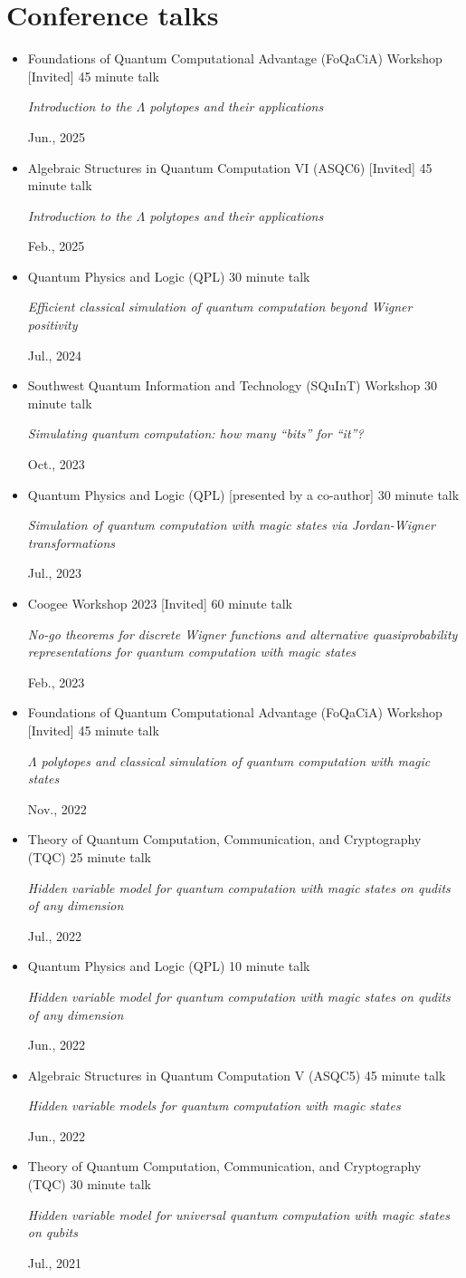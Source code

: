 \documentclass[letterpaper,11pt]{article}
\newcommand{\ConferenceItem}[4]{
	\item{\parbox{0.97\textwidth}{
		{#1} \hfill {#2}\\
		\parbox{0.86\textwidth}{\emph{#3}} \hfill {#4}
	}}
}
\begin{document}
\section*{Conference talks}
\begin{itemize}[leftmargin=*]
	\ConferenceItem{Foundations of Quantum Computational Advantage (FoQaCiA) Workshop [Invited]}{45 minute talk}{Introduction to the $\Lambda$ polytopes and their applications}{Jun., 2025}
	
	\ConferenceItem{Algebraic Structures in Quantum Computation VI (ASQC6) [Invited]}{45 minute talk}{Introduction to the $\Lambda$ polytopes and their applications}{Feb., 2025}
	
	\ConferenceItem{Quantum Physics and Logic (QPL)}{30 minute talk}{Efficient classical simulation of quantum computation beyond Wigner positivity}{Jul., 2024}
	
	\ConferenceItem{Southwest Quantum Information and Technology (SQuInT) Workshop}{30 minute talk}{Simulating quantum computation: how many ``bits'' for ``it''?}{Oct., 2023}
	
	\ConferenceItem{Quantum Physics and Logic (QPL) [presented by a co-author]}{30 minute talk}{Simulation of quantum computation with magic states via Jordan-Wigner transformations}{Jul., 2023}
	
	\ConferenceItem{Coogee Workshop 2023 [Invited]}{60 minute talk}{No-go theorems for discrete Wigner functions and alternative quasiprobability representations for quantum computation with magic states}{Feb., 2023}
	
	\ConferenceItem{Foundations of Quantum Computational Advantage (FoQaCiA) Workshop [Invited]}{45 minute talk}{$\Lambda$ polytopes and classical simulation of quantum computation with magic states}{Nov., 2022}
	
	\ConferenceItem{Theory of Quantum Computation, Communication, and Cryptography (TQC)}{25 minute talk}{Hidden variable model for quantum computation with magic states on qudits of any dimension}{Jul., 2022}
	
	\ConferenceItem{Quantum Physics and Logic (QPL)}{10 minute talk}{Hidden variable model for quantum computation with magic states on qudits of any dimension}{Jun., 2022}
	
	\ConferenceItem{Algebraic Structures in Quantum Computation V (ASQC5)}{45 minute talk}{Hidden variable models for quantum computation with magic states}{Jun., 2022}
	
	\ConferenceItem{Theory of Quantum Computation, Communication, and Cryptography (TQC)}{30 minute talk}{Hidden variable model for universal quantum computation with magic states on qubits}{Jul., 2021}
	

\end{itemize}
\end{document}
